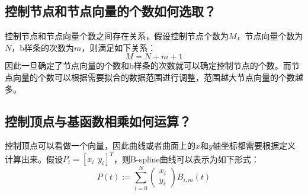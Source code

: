 \documentclass[10pt]{article}
\begin{document}
\subsection{控制节点和节点向量的个数如何选取？} 
控制节点和节点向量个数之间存在关系，假设控制节点个数为$M$，节点向量个数为$N$，b样条的次数为$m$，则满足如下关系：
$$M=N+m+1$$
因此一旦确定了节点向量的个数和b样条的次数就可以确定控制节点的个数。而节点向量的个数可以根据需要拟合的数据范围进行调整，范围越大节点向量的个数越多。

\subsection{控制顶点与基函数相乘如何运算？}
控制顶点可以看做一个向量，因此曲线或者曲面上的$x$和$y$轴坐标都需要根据定义计算出来。假设$P_i=[x_i         \hspace{5pt} y_i]^T$，则B-spline曲线可以表示为如下形式：
$$P(t):=\sum_{i=0}^{N}
\left(
\begin{array}{c}
x_i \\
y_i
\end{array}
\right)
B_{i,m}(t)
$$
\end{document}

